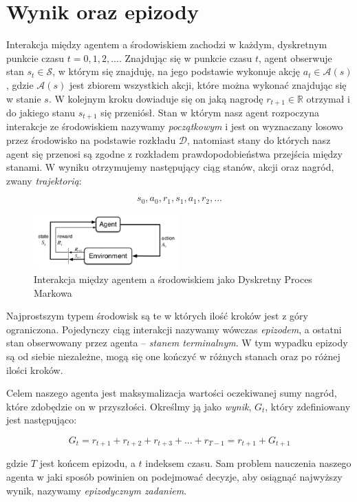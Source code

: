 \documentclass[licencjacka]{pracamgr}
\begin{document}
\section{Wynik oraz epizody}

Interakcja między agentem a środowiskiem zachodzi w każdym, dyskretnym punkcie czasu $ t = 0, 1, 2, ... $. Znajdując się w punkcie czasu $t$, agent obserwuje stan $ s_t \in \mathcal{S} $, w którym się znajduję, na jego podstawie wykonuje akcję $ a_t \in \mathcal{A}(s) $, gdzie $ \mathcal{A}(s) $ jest zbiorem wszystkich akcji, które można wykonać znajdując się w stanie $s$. W kolejnym kroku dowiaduje się on jaką nagrodę $ r_{t+1} \in \mathbb{R} $ otrzymał i do jakiego stanu $ s_{t+1} $ się przeniósł. Stan w którym nasz agent rozpoczyna interakcje ze środowiskiem nazywamy \emph{początkowym} i jest on wyznaczany losowo przez środowisko na podstawie rozkładu $\mathcal{D}$, natomiast stany do których nasz agent się przenosi są zgodne z rozkładem prawdopodobieństwa przejścia między stanami. W wyniku otrzymujemy następujący ciąg stanów, akcji oraz nagród, zwany \emph{trajektorią}:

$$ s_0, a_0, r_1, s_1, a_1, r_2, ... $$


\begin{figure}[ht]
  \centering
  \includegraphics[width=0.5\textwidth]{agent_env_interaction}
  \caption{Interakcja między agentem a środowiskiem jako Dyskretny Proces Markowa}
\end{figure}

Najprostszym typem środowisk są te w których ilość kroków jest z góry ograniczona. Pojedynczy ciąg interakcji nazywamy wówczas \emph{epizodem}, a ostatni stan obserwowany przez agenta -- \emph{stanem terminalnym}. W tym wypadku epizody są od siebie niezależne, mogą się one kończyć w różnych stanach oraz po różnej ilości kroków. 

Celem naszego agenta jest maksymalizacja wartości oczekiwanej sumy nagród, które zdobędzie on w przyszłości. Określmy ją jako \emph{wynik}, $ G_t $, który zdefiniowany jest następująco:

$$ G_t = r_{t+1} + r_{t+2} + r_{t+3} + ... + r_{T-1} = r_{t+1} + G_{t+1} $$

gdzie $T$ jest końcem epizodu, a $t$ indeksem czasu. Sam problem nauczenia naszego agenta w jaki sposób powinien on podejmować decyzje, aby osiągnąć najwyższy wynik, nazywamy \emph{epizodycznym zadaniem}.
\end{document}
